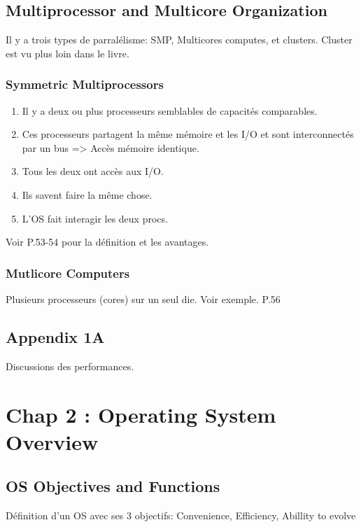 \subsection{Multiprocessor and Multicore Organization}
Il y a trois types de parralélisme: SMP, Multicores computes, et clusters. Cluster est vu plus loin dans le livre.

\subsubsection{Symmetric Multiprocessors}
\begin{enumerate}
	\item Il y a deux ou plus processeurs semblables de capacités comparables.
	\item Ces processeurs partagent la même mémoire et les I/O et sont interconnectés par un bus => Accès mémoire identique.
	\item Tous les deux ont accès aux I/O.
	\item Ils savent faire la même chose.
	\item L'OS fait interagir les deux procs.
\end{enumerate}
Voir P.53-54 pour la définition et les avantages.

\subsubsection{Mutlicore Computers}
Plusieurs processeurs (cores) sur un seul die. Voir exemple. P.56

\subsection{Appendix 1A}
Discussions des performances.

\newpage


\section{Chap 2 : Operating System Overview}

\subsection{OS Objectives and Functions}
Définition d’un OS avec ses 3 objectifs: Convenience, Efficiency, Abillity to evolve

